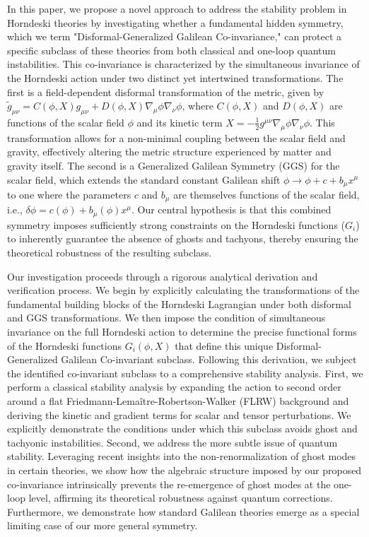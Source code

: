 \documentclass[twocolumn]{aastex631}
\begin{document}
In this paper, we propose a novel approach to address the stability problem in Horndeski theories by investigating whether a fundamental hidden symmetry, which we term "Disformal-Generalized Galilean Co-invariance," can protect a specific subclass of these theories from both classical and one-loop quantum instabilities. This co-invariance is characterized by the simultaneous invariance of the Horndeski action under two distinct yet intertwined transformations. The first is a field-dependent disformal transformation of the metric, given by $\tilde{g}_{\mu\nu} = C(\phi, X) g_{\mu\nu} + D(\phi, X) \nabla_\mu\phi \nabla_\nu\phi$, where $C(\phi, X)$ and $D(\phi, X)$ are functions of the scalar field $\phi$ and its kinetic term $X = -\frac{1}{2}g^{\mu\nu}\nabla_\mu\phi\nabla_\nu\phi$. This transformation allows for a non-minimal coupling between the scalar field and gravity, effectively altering the metric structure experienced by matter and gravity itself. The second is a Generalized Galilean Symmetry (GGS) for the scalar field, which extends the standard constant Galilean shift $\phi \to \phi + c + b_\mu x^\mu$ to one where the parameters $c$ and $b_\mu$ are themselves functions of the scalar field, i.e., $\delta \phi = c(\phi) + b_\mu(\phi) x^\mu$. Our central hypothesis is that this combined symmetry imposes sufficiently strong constraints on the Horndeski functions ($G_i$) to inherently guarantee the absence of ghosts and tachyons, thereby ensuring the theoretical robustness of the resulting subclass.

Our investigation proceeds through a rigorous analytical derivation and verification process. We begin by explicitly calculating the transformations of the fundamental building blocks of the Horndeski Lagrangian under both disformal and GGS transformations. We then impose the condition of simultaneous invariance on the full Horndeski action to determine the precise functional forms of the Horndeski functions $G_i(\phi, X)$ that define this unique Disformal-Generalized Galilean Co-invariant subclass. Following this derivation, we subject the identified co-invariant subclass to a comprehensive stability analysis. First, we perform a classical stability analysis by expanding the action to second order around a flat Friedmann-Lemaître-Robertson-Walker (FLRW) background and deriving the kinetic and gradient terms for scalar and tensor perturbations. We explicitly demonstrate the conditions under which this subclass avoids ghost and tachyonic instabilities. Second, we address the more subtle issue of quantum stability. Leveraging recent insights into the non-renormalization of ghost modes in certain theories, we show how the algebraic structure imposed by our proposed co-invariance intrinsically prevents the re-emergence of ghost modes at the one-loop level, affirming its theoretical robustness against quantum corrections. Furthermore, we demonstrate how standard Galilean theories emerge as a special limiting case of our more general symmetry.
\end{document}
